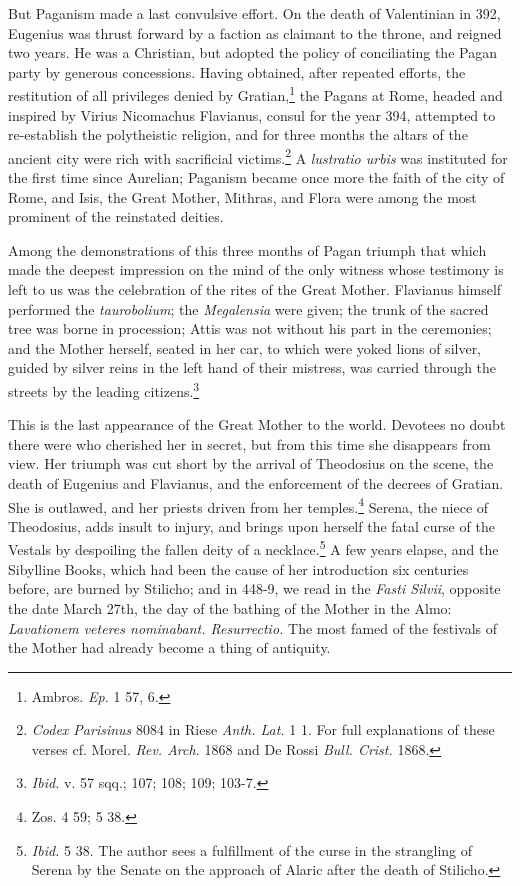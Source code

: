 \documentclass[a4paper, 11pt, oneside, polutonikogreek, english]{article}
\begin{document}
But Paganism made a last convulsive effort. On the death of Valentinian in 392, Eugenius was thrust forward by a faction as claimant to the throne, and reigned two years. He was a Christian, but adopted the policy of conciliating the Pagan party by generous concessions. Having obtained, after repeated efforts, the restitution of all privileges denied by Gratian,\footnote{Ambros. \emph{Ep.} 1 57, 6.} the Pagans at Rome, headed and inspired by Virius Nicomachus Flavianus, consul for the year 394, attempted to re-establish the polytheistic religion, and for three months the altars of the ancient city were rich with sacrificial victims.\footnote{\emph{Codex Parisinus} 8084 in Riese \emph{Anth. Lat.} 1 1. For full explanations of these verses cf. Morel. \emph{Rev. Arch.} 1868 and De Rossi \emph{Bull. Crist.} 1868.} A \emph{lustratio urbis} was instituted for the first time since Aurelian; Paganism became once more the faith of the city of Rome, and Isis, the Great Mother, Mithras, and Flora were among the most prominent of the reinstated deities.

Among the demonstrations of this three months of Pagan triumph that which made the deepest impression on the mind of the only witness whose testimony is left to us was the celebration of the rites of the Great Mother. Flavianus himself performed the \emph{taurobolium}; the \emph{Megalensia} were given; the trunk of the sacred tree was borne in procession; Attis was not without his part in the ceremonies; and the Mother herself, seated in her car, to which were yoked lions of silver, guided by silver reins in the left hand of their mistress, was carried through the streets by the leading citizens.\footnote{\emph{Ibid.} v. 57 sqq.; 107; 108; 109; 103-7.}

This is the last appearance of the Great Mother to the world. Devotees no doubt there were who cherished her in secret, but from this time she disappears from view. Her triumph was cut short by the arrival of Theodosius on the scene, the death of Eugenius and Flavianus, and the enforcement of the decrees of Gratian. She is outlawed, and her priests driven from her temples.\footnote{Zos. 4 59; 5 38.} Serena, the niece of Theodosius, adds insult to injury, and brings upon herself the fatal curse of the Vestals by despoiling the fallen deity of a necklace.\footnote{\emph{Ibid.} 5 38. The author sees a fulfillment of the curse in the strangling of Serena by the Senate on the approach of Alaric after the death of Stilicho.} A few years elapse, and the Sibylline Books, which had been the cause of her introduction six centuries before, are burned by Stilicho; and in 448-9, we read in the \emph{Fasti Silvii}, opposite the date March 27th, the day of the bathing of the Mother in the Almo: \emph{Lavationem veteres nominabant. Resurrectio.} The most famed of the festivals of the Mother had already become a thing of antiquity.
\end{document}
